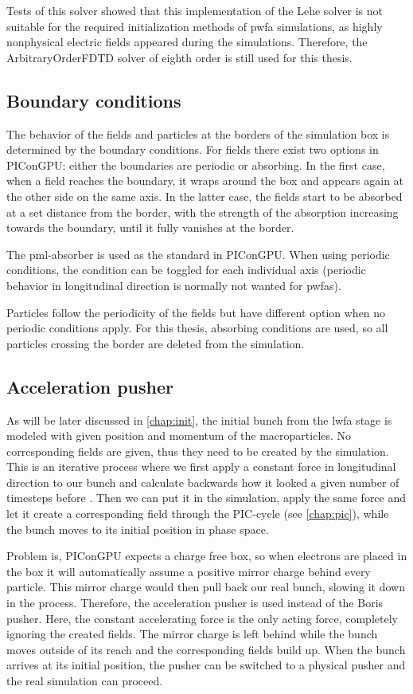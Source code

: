 \documentclass[bachelor_thesis]{subfiles}
\begin{document}
Tests of this solver showed that this implementation of the Lehe solver is not suitable for the required initialization methods of \gls{pwfa} simulations, as highly nonphysical electric fields appeared during the simulations. 
Therefore, the ArbitraryOrderFDTD solver of eighth order is still used for this thesis.


\subsection{Boundary conditions}
The behavior of the fields and particles at the borders of the simulation box is determined by the boundary conditions.
For fields there exist two options in PIConGPU: either the boundaries are periodic or absorbing. In the first case, when a field reaches the boundary, it wraps around the box and appears again at the other side on the same axis.
In the latter case, the fields start to be absorbed at a set distance from the border, with the strength of the absorption increasing towards the boundary, until it fully vanishes at the border.

The \gls{pml}-absorber is used as the standard in PIConGPU. When using periodic conditions, the condition can be toggled for each individual axis (periodic behavior in longitudinal direction is normally not wanted for \gls{pwfa}s).

Particles follow the periodicity of the fields but have different option when no periodic conditions apply. For this thesis, absorbing conditions are used, so all particles crossing the border are deleted from the simulation.

\subsection{Acceleration pusher} \label{chap:accpush}
As will be later discussed in \autoref{chap:init}, the initial bunch from the \gls{lwfa} stage is modeled with given position and momentum of the macroparticles.
No corresponding fields are given, thus they need to be created by the simulation. This is an iterative process where we first apply a constant force in longitudinal direction to our bunch and calculate backwards how it looked a given number of timesteps before \cite{Huebl2014}.
Then we can put it in the simulation, apply the same force and let it create a corresponding field through the PIC-cycle (see \autoref{chap:pic}), while the bunch moves to its initial position in phase space.

Problem is, PIConGPU expects a charge free box, so when electrons are placed in the box it will automatically assume a positive mirror charge behind every particle. This mirror charge would then pull back our real 
bunch, slowing it down in the process. Therefore, the acceleration pusher is used instead of the Boris pusher. Here, the constant accelerating force is the only acting force, completely ignoring the created fields.
The mirror charge is left behind while the bunch moves outside of its reach and the corresponding fields build up. When the bunch arrives at its initial position, the pusher can be switched to a physical pusher and
the real simulation can proceed.
\end{document}

